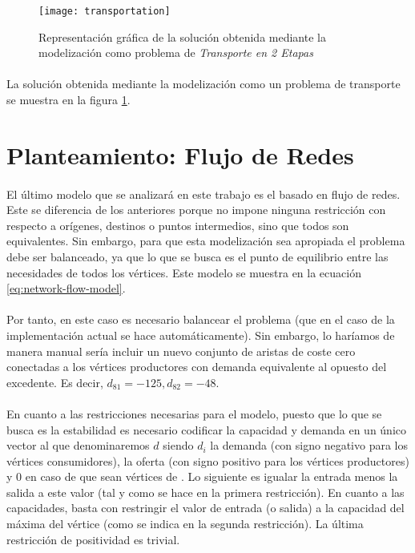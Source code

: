 \documentclass[a4paper, spanish]{article}
\begin{document}
    \begin{figure}[!hp]
      \centering
      \texttt{[image: transportation]}
      \caption{Representación gráfica de la solución obtenida mediante la modelización como problema de \emph{Transporte en 2 Etapas}}
      \label{img:graph-transportation}
    \end{figure}

    \paragraph{}
    La solución obtenida mediante la modelización como un problema de transporte se muestra en la figura \ref{img:graph-transportation}.


  \section{Planteamiento: Flujo de Redes}
  \label{section:network-flow}

    \paragraph{}
    El último modelo que se analizará en este trabajo es el basado en  flujo de redes. Este se diferencia de los anteriores porque no impone ninguna restricción con respecto a orígenes, destinos o puntos intermedios, sino que todos son equivalentes. Sin embargo, para que esta modelización sea apropiada el problema debe ser balanceado, ya que lo que se busca es el punto de equilibrio entre las necesidades de todos los vértices.  Este modelo se muestra en la ecuación \eqref{eq:network-flow-model}.

    \paragraph{}
    Por tanto, en este caso es necesario balancear el problema (que en el caso de la implementación actual se hace automáticamente). Sin embargo, lo haríamos de manera manual sería incluir un nuevo conjunto de aristas de coste cero conectadas a los vértices productores con demanda equivalente al opuesto del excedente. Es decir, $d_{81} = -125, d_{82} = -48$.

    \paragraph{}
    En cuanto a las restricciones necesarias para el modelo, puesto que lo que se busca es la estabilidad es necesario codificar la capacidad y demanda en un único vector al que denominaremos $d$ siendo $d_{i}$ la demanda (con signo negativo para los vértices consumidores), la oferta (con signo positivo para los vértices productores) y 0 en caso de que sean vértices de . Lo siguiente es igualar la entrada menos la salida a este valor (tal y como se hace en la primera restricción). En cuanto a las capacidades, basta con restringir el valor de entrada (o salida) a la capacidad del máxima del vértice (como se indica en la segunda restricción). La última restricción de positividad es trivial.
\end{document}
